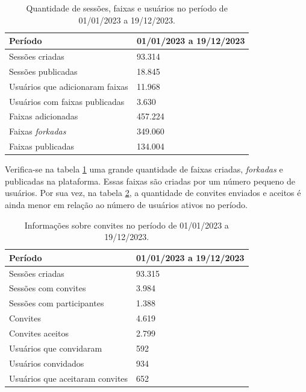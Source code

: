 
\begin{table}[H]
  \centering
  \begin{tabular}{|l|l|}
    \hline
    \textbf{Período} & 01/01/2023 a 19/12/2023 \\ \hline
    Sessões criadas & 93.314 \\ \hline
    Sessões publicadas & 18.845 \\ \hline
    Usuários que adicionaram faixas & 11.968 \\ \hline
    Usuários com faixas publicadas & 3.630 \\ \hline
    Faixas adicionadas & 457.224 \\ \hline
    Faixas \textit{forkadas} & 349.060 \\ \hline
    Faixas publicadas & 134.004 \\ \hline
  \end{tabular}
  \caption{Quantidade de sessões, faixas e usuários no período de 01/01/2023 a 19/12/2023.}
  \label{tab_sessoes}
\end{table}

Verifica-se na tabela \ref{tab_sessoes} uma grande quantidade de faixas criadas,
\textit{forkadas} e publicadas na plataforma. Essas faixas são criadas por um
número pequeno de usuários. Por sua vez, na tabela \ref{tab_convites}, a
quantidade de convites enviados e aceitos é ainda menor em relação ao número de
usuários ativos no período.

\begin{table}[htbp]
  \centering
  \begin{tabular}{|l|l|}
    \hline
    \textbf{Período} & 01/01/2023 a 19/12/2023 \\ \hline
    Sessões criadas & 93.315 \\ \hline
    Sessões com convites & 3.984 \\ \hline
    Sessões com participantes & 1.388 \\ \hline
    Convites & 4.619 \\ \hline
    Convites aceitos & 2.799 \\ \hline
    Usuários que convidaram & 592 \\ \hline
    Usuários convidados & 934 \\ \hline
    Usuários que aceitaram convites & 652 \\ \hline
  \end{tabular}
  \caption{Informações sobre convites no período de 01/01/2023 a 19/12/2023.}
  \label{tab_convites}
\end{table}

